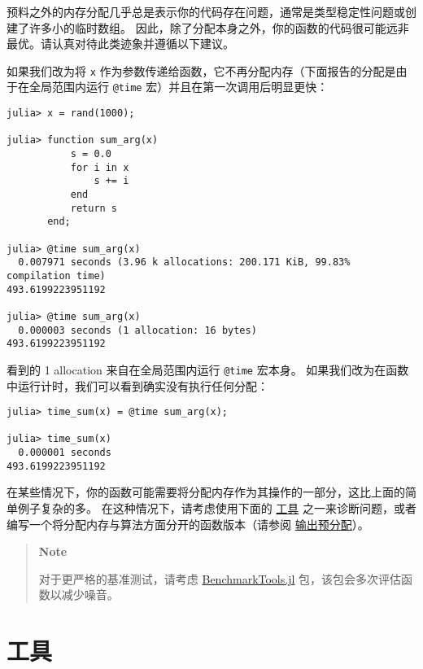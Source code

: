 预料之外的内存分配几乎总是表示你的代码存在问题，通常是类型稳定性问题或创建了许多小的临时数组。 因此，除了分配本身之外，你的函数的代码很可能远非最优。请认真对待此类迹象并遵循以下建议。



如果我们改为将 \texttt{x} 作为参数传递给函数，它不再分配内存（下面报告的分配是由于在全局范围内运行 \texttt{@time} 宏）并且在第一次调用后明显更快：




\begin{verbatim}
julia> x = rand(1000);

julia> function sum_arg(x)
           s = 0.0
           for i in x
               s += i
           end
           return s
       end;

julia> @time sum_arg(x)
  0.007971 seconds (3.96 k allocations: 200.171 KiB, 99.83% compilation time)
493.6199223951192

julia> @time sum_arg(x)
  0.000003 seconds (1 allocation: 16 bytes)
493.6199223951192
\end{verbatim}



看到的 1 allocation 来自在全局范围内运行 \texttt{@time} 宏本身。 如果我们改为在函数中运行计时，我们可以看到确实没有执行任何分配：




\begin{verbatim}
julia> time_sum(x) = @time sum_arg(x);

julia> time_sum(x)
  0.000001 seconds
493.6199223951192
\end{verbatim}



在某些情况下，你的函数可能需要将分配内存作为其操作的一部分，这比上面的简单例子复杂的多。 在这种情况下，请考虑使用下面的 \hyperlink{11178925956438684264}{工具} 之一来诊断问题，或者编写一个将分配内存与算法方面分开的函数版本（请参阅 \href{@ref Pre-allocating outputs}{输出预分配}）。



\begin{quote}
\textbf{Note}

对于更严格的基准测试，请考虑 \href{https://github.com/JuliaCI/BenchmarkTools.jl}{BenchmarkTools.jl} 包，该包会多次评估函数以减少噪音。

\end{quote}


\hypertarget{14350444000650775715}{}


\section{工具}



